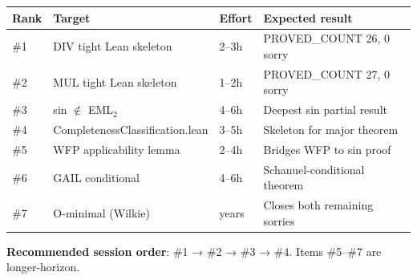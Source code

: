 \documentclass[12pt]{article}
\theoremstyle{definition}
\begin{document}
\begin{center}
\begin{tabular}{llll}
\toprule
Rank & Target & Effort & Expected result \\
\midrule
\#1 & DIV tight Lean skeleton & 2--3h & PROVED\_COUNT 26, 0 sorry \\
\#2 & MUL tight Lean skeleton & 1--2h & PROVED\_COUNT 27, 0 sorry \\
\#3 & sin $\notin$ EML$_2$ & 4--6h & Deepest sin partial result \\
\#4 & CompletenessClassification.lean & 3--5h & Skeleton for major theorem \\
\#5 & WFP applicability lemma & 2--4h & Bridges WFP to sin proof \\
\#6 & GAIL conditional & 4--6h & Schanuel-conditional theorem \\
\#7 & O-minimal (Wilkie) & years & Closes both remaining sorries \\
\bottomrule
\end{tabular}
\end{center}

\textbf{Recommended session order}: \#1 → \#2 → \#3 → \#4.
Items \#5--\#7 are longer-horizon.
\end{document}
